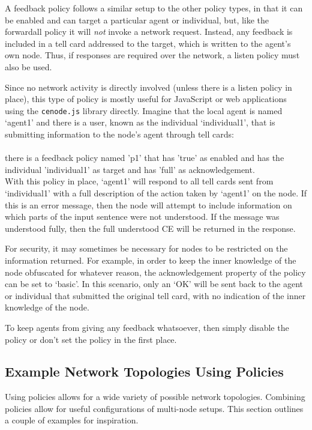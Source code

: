 \documentclass{scrartcl}
\newcommand{\ce}[1]{\textsf{#1}}
\newcommand{\js}[1]{\texttt{#1}}
\begin{document}
A \ce{feedback policy} follows a similar setup to the other policy types, in that it can be enabled and can target a particular agent or individual, but, like the \ce{forwardall policy} it will \textit{not} invoke a network request. Instead, any feedback is included in a \ce{tell card} addressed to the target, which is written to the agent's own node. Thus, if responses are required over the network, a \ce{listen policy} must also be used.

Since no network activity is directly involved (unless there is a \ce{listen policy} in place), this type of policy is mostly useful for JavaScript or web applications using the \js{cenode.js} library directly. Imagine that the local agent is named `agent1' and there is a user, known as the individual `individual1', that is submitting information to the node's agent through \ce{tell card}s:\\
\\\ce{there is a feedback policy named 'p1' that has 'true' as enabled and has the individual 'individual1' as target and has 'full' as acknowledgement.}\\

With this policy in place, `agent1' will respond to all \ce{tell card}s sent from `individual1' with a full description of the action taken by `agent1' on the node. If this is an error message, then the node will attempt to include information on which parts of the input sentence were not understood. If the message was understood fully, then the full understood CE will be returned in the response.

For security, it may sometimes be necessary for nodes to be restricted on the information returned. For example, in order to keep the inner knowledge of the node obfuscated for whatever reason, the \ce{acknowledgement} property of the policy can be set to `basic'. In this scenario, only an `OK' will be sent back to the agent or individual that submitted the original tell card, with no indication of the inner knowledge of the node.

To keep agents from giving any feedback whatsoever, then simply disable the policy or don't set the policy in the first place.

\subsection{Example Network Topologies Using Policies}
Using policies allows for a wide variety of possible network topologies. Combining policies allow for useful configurations of multi-node setups. This section outlines a couple of examples for inspiration.
\end{document}

